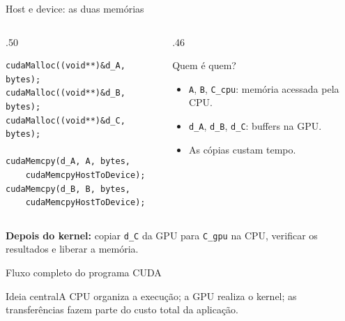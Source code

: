 \documentclass[aspectratio=169,11pt]{beamer}
\newcommand{\ideia}[1]{\begin{block}{Ideia central}#1\end{block}}
\begin{document}
\begin{frame}[fragile]{Host e device: as duas memórias}
\begin{columns}[T]
\begin{column}{.50\linewidth}
\begin{lstlisting}[style=prog]
cudaMalloc((void**)&d_A, bytes);
cudaMalloc((void**)&d_B, bytes);
cudaMalloc((void**)&d_C, bytes);

cudaMemcpy(d_A, A, bytes,
    cudaMemcpyHostToDevice);
cudaMemcpy(d_B, B, bytes,
    cudaMemcpyHostToDevice);
\end{lstlisting}
\end{column}
\begin{column}{.46\linewidth}
\begin{block}{Quem é quem?}
\begin{itemize}
\item \texttt{A}, \texttt{B}, \texttt{C\_cpu}: memória acessada pela CPU.
\item \texttt{d\_A}, \texttt{d\_B}, \texttt{d\_C}: buffers na GPU.
\item As cópias custam tempo.
\end{itemize}
\end{block}
\end{column}
\end{columns}
\vspace{2mm}
\small \textbf{Depois do kernel:} copiar \texttt{d\_C} da GPU para \texttt{C\_gpu} na CPU, verificar os resultados e liberar a memória.
\end{frame}

\begin{frame}{Fluxo completo do programa CUDA}
\centering
{}
\vspace{5mm}
\ideia{A CPU organiza a execução; a GPU realiza o kernel; as transferências fazem parte do custo total da aplicação.}
\end{frame}
\end{document}
